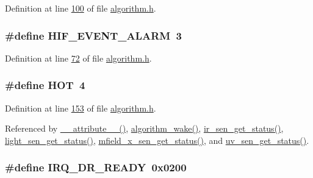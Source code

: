 Definition at line \hyperlink{a00021_source_l00100}{100} of file \hyperlink{a00021_source}{algorithm.\+h}.

\hypertarget{a00021_aab5d5969b3cff6fd6cd4a7e2cbbc139d}{
\subsubsection[{H\+I\+F\+\_\+\+E\+V\+E\+N\+T\+\_\+\+A\+L\+A\+R\+M}]{\setlength{\rightskip}{0pt plus 5cm}\#define H\+I\+F\+\_\+\+E\+V\+E\+N\+T\+\_\+\+A\+L\+A\+R\+M~3}}\label{a00021_aab5d5969b3cff6fd6cd4a7e2cbbc139d}


Definition at line \hyperlink{a00021_source_l00072}{72} of file \hyperlink{a00021_source}{algorithm.\+h}.

\hypertarget{a00021_a1eb14cc432874ddacd1934791dbe12a3}{
\subsubsection[{H\+O\+T}]{\setlength{\rightskip}{0pt plus 5cm}\#define H\+O\+T~4}}\label{a00021_a1eb14cc432874ddacd1934791dbe12a3}


Definition at line \hyperlink{a00021_source_l00153}{153} of file \hyperlink{a00021_source}{algorithm.\+h}.



Referenced by \hyperlink{a00041_source_l00025}{\+\_\+\+\_\+attribute\+\_\+\+\_\+()}, \hyperlink{a00038_source_l00670}{algorithm\+\_\+wake()}, \hyperlink{a00045_source_l00302}{ir\+\_\+sen\+\_\+get\+\_\+status()}, \hyperlink{a00047_source_l00204}{light\+\_\+sen\+\_\+get\+\_\+status()}, \hyperlink{a00050_source_l00276}{mfield\+\_\+x\+\_\+sen\+\_\+get\+\_\+status()}, and \hyperlink{a00073_source_l00302}{uv\+\_\+sen\+\_\+get\+\_\+status()}.

\hypertarget{a00021_acfd80444497090bce928df199247a0ec}{
\subsubsection[{I\+R\+Q\+\_\+\+D\+R\+\_\+\+R\+E\+A\+D\+Y}]{\setlength{\rightskip}{0pt plus 5cm}\#define I\+R\+Q\+\_\+\+D\+R\+\_\+\+R\+E\+A\+D\+Y~0x0200}}\label{a00021_acfd80444497090bce928df199247a0ec}


